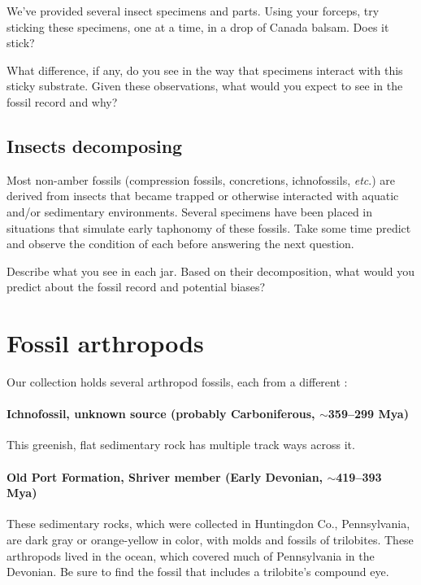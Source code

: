 \noindent{}We've provided several insect specimens and parts. Using your forceps, try sticking these specimens, one at a time, in a drop of Canada balsam. Does it stick?

\begin{theo}
{}What difference, if any, do you see in the way that specimens interact with this sticky substrate. Given these observations, what would you expect to see in the fossil record and why?\end{theo}\vspace{3mm}

\subsection{Insects decomposing}
Most non-amber fossils (compression fossils, concretions, ichnofossils, \textit{etc}.) are derived from insects that became trapped or otherwise interacted with aquatic and/or sedimentary environments. Several specimens have been placed in situations that simulate early taphonomy of these fossils. Take some time predict and observe the condition of each before answering the next question.\vspace{3mm}

\begin{theo}
{}Describe what you see in each jar. Based on their decomposition, what would you predict about the fossil record and potential biases?\end{theo}

\section{Fossil arthropods}
Our collection holds several arthropod fossils, each from a different : 

\paragraph{Ichnofossil, unknown source (probably Carboniferous, $\sim$359--299 Mya)} This greenish, flat sedimentary rock has multiple track ways across it.

\paragraph{Old Port Formation, Shriver member (Early Devonian, $\sim$419--393 Mya)} These sedimentary rocks, which were collected in Huntingdon Co., Pennsylvania, are dark gray or orange-yellow in color, with molds and fossils of trilobites. These arthropods lived in the ocean, which covered much of Pennsylvania in the Devonian. Be sure to find the fossil that includes a trilobite's compound eye.

